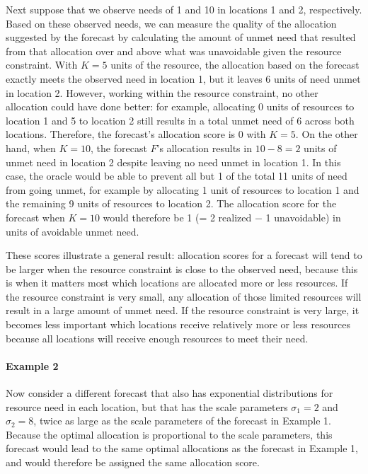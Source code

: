 \documentclass{article}
\begin{document}
Next suppose that we observe needs of 1 and 10 in locations 1 and 2, respectively.
Based on these observed needs, we can measure the quality of the allocation suggested by the forecast by calculating the amount of unmet need that resulted from that allocation over and above what was unavoidable given the resource constraint.
With $K = 5$ units of the resource, the allocation based on the forecast exactly meets the observed need in location 1, but it leaves 6 units of need unmet in location 2.
However, working within the resource constraint, no other allocation could have done better: for example, allocating 0 units of resources to location 1 and 5 to location 2 still results in a total unmet need of 6 across both locations. Therefore, the forecast's allocation score is 0 with $K = 5$.
On the other hand, when $K = 10$, the forecast $F$'s allocation results in $10 - 8 = 2$ units of unmet need in location 2 despite leaving no need unmet in location 1.
In this case, the oracle would be able to prevent all but 1 of the total 11 units of need from going unmet, for example by allocating 1 unit of resources to location 1 and the remaining 9 units of resources to location 2.
The allocation score for the forecast when $K = 10$ would therefore be 1 (= 2 realized $-$ 1 unavoidable) in units of avoidable unmet need.

These scores illustrate a general result: allocation scores for a forecast will tend to be larger when the resource constraint is close to the observed need, because this is when it matters most which locations are allocated more or less resources. If the resource constraint is very small, any allocation of those limited resources will result in a large amount of unmet need. If the resource constraint is very large, it becomes less important which locations receive relatively more or less resources because all locations will receive enough resources to meet their need.

\paragraph{Example 2} Now consider a different forecast that also has exponential distributions for resource need in each location, but that has the scale parameters $\sigma_1 = 2$ and $\sigma_2 = 8$, twice as large as the scale parameters of the forecast in Example 1. Because the optimal allocation is proportional to the scale parameters, this forecast would lead to the same optimal allocations as the forecast in Example 1, and would therefore be assigned the same allocation score.
\end{document}
